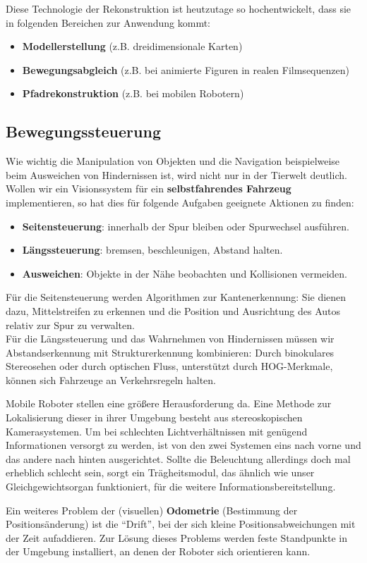 Diese Technologie der Rekonstruktion ist heutzutage so hochentwickelt, dass sie in folgenden Bereichen zur Anwendung kommt:
\begin{itemize}
  \item \textbf{Modellerstellung} (z.B. dreidimensionale Karten)
  \item \textbf{Bewegungsabgleich} (z.B. bei animierte Figuren in realen Filmsequenzen)
  \item \textbf{Pfadrekonstruktion} (z.B. bei mobilen Robotern)
\end{itemize}


\subsection{Bewegungssteuerung}
Wie wichtig die Manipulation von Objekten und die Navigation beispielweise beim Ausweichen von Hindernissen ist, wird nicht nur in der Tierwelt deutlich. Wollen wir ein Visionssystem für ein \textbf{selbstfahrendes Fahrzeug} implementieren, so hat dies für folgende Aufgaben geeignete Aktionen zu finden:
\begin{itemize}
  \item \textbf{Seitensteuerung}: innerhalb der Spur bleiben oder Spurwechsel ausführen.
  \item \textbf{Längssteuerung}: bremsen, beschleunigen, Abstand halten.
  \item \textbf{Ausweichen}: Objekte in der Nähe beobachten und Kollisionen vermeiden.
\end{itemize}
Für die Seitensteuerung werden Algorithmen zur Kantenerkennung: Sie dienen dazu, Mittelstreifen zu erkennen und die Position und Ausrichtung des Autos relativ zur Spur zu verwalten.\\
Für die Längssteuerung und das Wahrnehmen von Hindernissen müssen wir Abstandserkennung mit Strukturerkennung kombinieren: Durch binokulares Stereosehen oder durch optischen Fluss, unterstützt durch HOG-Merkmale, können sich Fahrzeuge an Verkehrsregeln halten.

Mobile Roboter stellen eine größere Herausforderung da. Eine Methode zur Lokalisierung dieser in ihrer Umgebung besteht aus stereoskopischen Kamerasystemen. Um bei schlechten Lichtverhältnissen mit genügend Informationen versorgt zu werden, ist von den zwei Systemen eins nach vorne und das andere nach hinten ausgerichtet. Sollte die Beleuchtung allerdings doch mal erheblich schlecht sein, sorgt ein Trägheitsmodul, das ähnlich wie unser Gleichgewichtsorgan funktioniert, für die weitere Informationsbereitstellung.

Ein weiteres Problem der (visuellen) \textbf{Odometrie} (Bestimmung der Positionsänderung) ist die "`Drift"', bei der sich kleine Positionsabweichungen mit der Zeit aufaddieren. Zur Lösung dieses Problems werden feste Standpunkte in der Umgebung installiert, an denen der Roboter sich orientieren kann.
